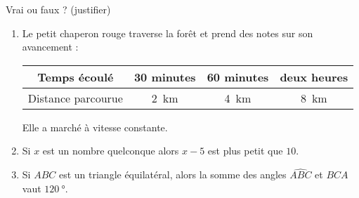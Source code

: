 
\begin{exercice}\label{exo2smath-0283}

    Vrai ou faux ? (justifier)
    \begin{enumerate}
        \item
            Le petit chaperon rouge traverse la forêt et prend des notes sur son avancement :
            \begin{center}
                \begin{tabular}[]{|c||c|c|c|}
                    \hline
                    Temps écoulé&30 minutes&60 minutes&deux heures\\
                    \hline
                    Distance parcourue&\SI{2}{\kilo\meter}&\SI{4}{\kilo\meter}&\SI{8}{\kilo\meter}\\ 
                    \hline
                \end{tabular}
            \end{center}
            Elle a marché à vitesse constante.
        \item
            Si \( x\) est un nombre quelconque alors \( x-5\) est plus petit que \( 10\).
        \item
            Si \( ABC\) est un triangle équilatéral, alors la somme des angles \( \widehat{ABC}\) et \( \widehat{BCA}\) vaut \(\SI{120}{\degree}\).
    \end{enumerate}

\end{exercice}
